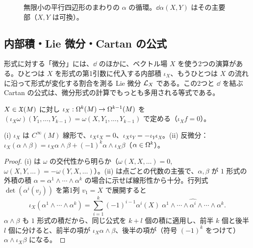 \begin{figure}[ht]
\centering
{}
\caption{無限小の平行四辺形のまわりの $\alpha$ の循環。$\dd\alpha(X,Y)$ はその主要部（$X,Y$ は可換）。}\label{B:fig:circ}
\end{figure}

\subsection{内部積・Lie 微分・Cartan の公式}\label{B:ss:cartan}

形式に対する「微分」には、$\dd$ のほかに、ベクトル場 $X$ を使う2つの演算がある。ひとつは $X$ を形式の第1引数に代入する内部積 $\iota_X$、もうひとつは $X$ の流れに沿って形式が変化する割合を測る Lie 微分 $\mathcal L_X$ である。この2つと $\dd$ を結ぶ Cartan の公式は、微分形式の計算でもっとも多用される等式である。

\begin{defn}[内部積]
$X\in\mathfrak X(M)$ に対し $\iota_X:\Omega^k(M)\to\Omega^{k-1}(M)$ を $(\iota_X\omega)(Y_1,\dots,Y_{k-1})=\omega(X,Y_1,\dots,Y_{k-1})$ で定める（$\iota_Xf=0$）。
\end{defn}

\begin{prop}[内部積の性質]\label{B:prop:iota}\tP
(i) $\iota_X$ は $C^\infty(M)$ 線形で、$\iota_X\iota_X=0$、$\iota_X\iota_Y=-\iota_Y\iota_X$。(ii) 反微分：$\iota_X(\alpha\wedge\beta)=\iota_X\alpha\wedge\beta+(-1)^k\alpha\wedge\iota_X\beta$（$\alpha\in\Omega^k$）。
\end{prop}
\begin{proof}
(i) は $\omega$ の交代性から明らか（$\omega(X,X,\dots)=0$, $\omega(X,Y,\dots)=-\omega(Y,X,\dots)$）。(ii) は点ごとの代数の主張で、$\alpha,\beta$ が $1$ 形式の外積の積 $\alpha=\alpha^1\wedge\cdots\wedge\alpha^k$ の場合に示せば線形性から十分。行列式 $\det(\alpha^i(v_j))$ を第1列 $v_1=X$ で展開すると
\[
\iota_X(\alpha^1\wedge\cdots\wedge\alpha^k)=\sum_{i=1}^k(-1)^{i-1}\alpha^i(X)\;\alpha^1\wedge\cdots\wedge\widehat{\alpha^i}\wedge\cdots\wedge\alpha^k .
\]
$\alpha\wedge\beta$ も $1$ 形式の積だから、同じ公式を $k+l$ 個の積に適用し、前半 $k$ 個と後半 $l$ 個に分けると、前半の項が $\iota_X\alpha\wedge\beta$、後半の項が（符号 $(-1)^k$ をつけて）$\alpha\wedge\iota_X\beta$ になる。
\end{proof}

